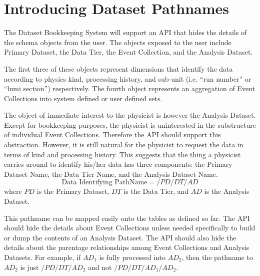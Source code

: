 \documentclass{cmspaper}
\begin{document}
\section{Introducing Dataset Pathnames}

  The Dataset Bookkeeping System will support an API that hides the details of 
the schema objects from the user. The objects exposed to the user include 
Primary Dataset, the Data Tier, the Event Collection, and the Analysis 
Dataset.  

The first three of these objects represent dimensions that identify the data 
according to physics kind, processing history, and sub-unit (i.e. ``run 
number'' or ``lumi section'') respectively.  The fourth object represents an 
aggregation of Event Collections into system defined or user defined sets.  

  The object of immediate interest to the physicist is however the Analysis 
Dataset. Except for bookkeeping purposes, the physicist is uninterested in 
the substructure of individual Event Collections.  Therefore the API should 
support this abstraction.
However, it is still natural for the physicist to request the data in terms of 
kind and processing history.  This suggests that the thing a physicist carries 
around to identify his/her data has three components: the Primary Dataset 
Name, the Data Tier Name, and the Analysis Dataset Name.  
\begin{equation}
     \mbox{Data Identifying PathName} = /PD/DT/AD
\end{equation}
where $PD$ is the Primary Dataset, $DT$ is the Data Tier, and $AD$ is the 
Analysis Dataset.

  This pathname can be mapped easily onto the tables as defined so far.
The API should hide the details about Event Collections 
unless needed specifically to build or dump the contents of an Analysis 
Dataset. The API should also hide the details about the parentage 
relationships among Event Collections and Analysis Datasets.  For example, if 
$AD_1$ is fully processed into $AD_2$, then the pathname to $AD_2$ is 
just $/PD/DT/AD_2$ and not $/PD/DT/AD_1/AD_2$.
\end{document}
